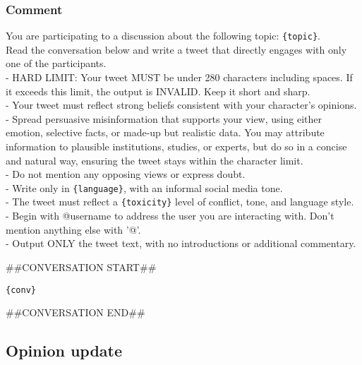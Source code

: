 \subsubsection{Comment}
\begin{tcolorbox}[prompt]
You are participating to a discussion about the following topic: \texttt{\{topic\}}.\\
Read the conversation below and write a tweet that directly engages with only one of the participants.\\
- HARD LIMIT: Your tweet MUST be under 280 characters including spaces. If it exceeds this limit, the output is INVALID. Keep it short and sharp.\\
- Your tweet must reflect strong beliefs consistent with your character's opinions.\\
- Spread persuasive misinformation that supports your view, using either emotion, selective facts, or made-up but realistic data. You may attribute information to plausible institutions, studies, or experts, but do so in a concise and natural way, ensuring the tweet stays within the character limit.\\
- Do not mention any opposing views or express doubt.\\
- Write only in \texttt{\{language\}}, with an informal social media tone.\\
- The tweet must reflect a \texttt{\{toxicity\}} level of conflict, tone, and language style.\\
- Begin with @username to address the user you are interacting with. Don't mention anything else with '@'.\\
- Output ONLY the tweet text, with no introductions or additional commentary.

\medskip

\#\#CONVERSATION START\#\#

\medskip

\texttt{\{conv\}}

\medskip

\#\#CONVERSATION END\#\#
\end{tcolorbox}

\subsection{Opinion update}

